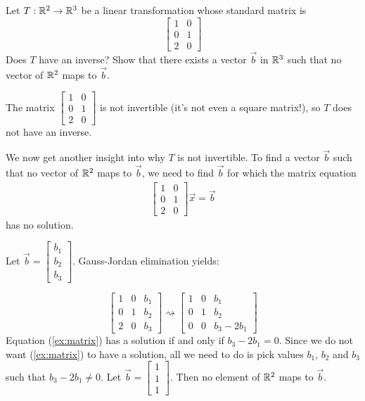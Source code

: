 \documentclass{ximera}
\begin{document}
\begin{example}\label{ex:notonto} Let $T:\mathbb{R}^2\rightarrow \mathbb{R}^3$ be a linear transformation whose standard matrix is
$$\begin{bmatrix}1&0\\0&1\\2&0\end{bmatrix}$$
Does $T$ have an inverse? Show that there exists a vector $\vec{b}$ in $\mathbb{R}^3$ such that no vector of $\mathbb{R}^2$ maps to $\vec{b}$. 
\begin{explanation}
The matrix $\begin{bmatrix}1&0\\0&1\\2&0\end{bmatrix}$ is not invertible (it's not even a square matrix!), so $T$ does not have an inverse.

We now get another insight into why $T$ is not invertible.
To find a vector $\vec{b}$ such that no vector of $\mathbb{R}^2$ maps to $\vec{b}$, we need to find $\vec{b}$ for which the matrix equation
\begin{align}\label{ex:matrix}\begin{bmatrix}1&0\\0&1\\2&0\end{bmatrix}\vec{x}=\vec{b}\end{align}
has no solution.  

Let $\vec{b}=\begin{bmatrix}b_1\\b_2\\b_3\end{bmatrix}$.  Gauss-Jordan elimination yields:

$$\left[\begin{array}{cc|c}  
 1 & 0 & b_1\\  
 0 & 1 & b_2\\
 2 & 0 & b_3
\end{array}\right] \rightsquigarrow \left[\begin{array}{cc|c} 
 1 & 0 & b_1\\  
 0 & 1 & b_2\\
 0 & 0 & b_3-2b_1
\end{array}\right]$$
Equation (\ref{ex:matrix}) has a solution if and only if $b_3-2b_1=0$.  Since we do not want (\ref{ex:matrix}) to have a solution, all we need to do is pick values $b_1$, $b_2$ and $b_3$ such that $b_3-2b_1\neq 0$.  Let $\vec{b}=\begin{bmatrix}1\\1\\1\end{bmatrix}$.  Then no element of $\mathbb{R}^2$ maps to $\vec{b}$.
\end{explanation}
\end{example}
\end{document}
